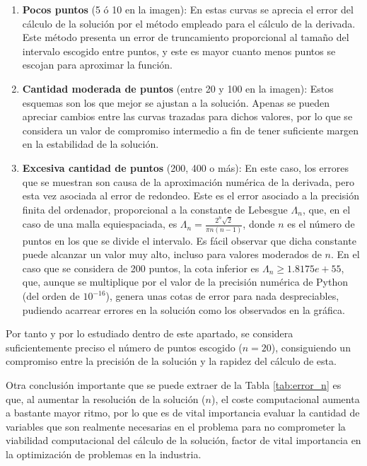 \begin{enumerate}
    \item \textbf{Pocos puntos} (5 ó 10 en la imagen): En estas curvas se aprecia el error del cálculo de la solución por el método empleado para el cálculo de la derivada. Este método presenta un error de truncamiento proporcional al tamaño del intervalo escogido entre puntos, y este es mayor cuanto menos puntos se escojan para aproximar la función.

    \item \textbf{Cantidad moderada de puntos} (entre 20 y 100 en la imagen): Estos esquemas son los que mejor se ajustan a la solución. Apenas se pueden apreciar cambios entre las curvas trazadas para dichos valores, por lo que se considera un valor de compromiso intermedio a fin de tener suficiente margen en la estabilidad de la solución.

    \item \textbf{Excesiva cantidad de puntos} (200, 400 o más): En este caso, los errores que se muestran son causa de la aproximación numérica de la derivada, pero esta vez asociada al error de redondeo. Este es el error asociado a la precisión finita del ordenador, proporcional a la constante de Lebesgue $\Lambda_n$, que, en el caso de una malla equiespaciada, es $\Lambda_n = \frac{2^n \sqrt{2}}{\pi n (n - 1)}$, donde $n$ es el número de puntos en los que se divide el intervalo. Es fácil observar que dicha constante puede alcanzar un valor muy alto, incluso para valores moderados de $n$. En el caso que se considera de 200 puntos, la cota inferior es $\Lambda_n \geq 1.8175e+55$, que,  aunque se multiplique por el valor de la precisión numérica de Python (del orden de $10^{-16}$), genera unas cotas de error para nada despreciables, pudiendo acarrear errores en la solución como los observados en la gráfica.
\end{enumerate}

Por tanto y por lo estudiado dentro de este apartado, se considera suficientemente preciso el número de puntos escogido ($n = 20$), consiguiendo un compromiso entre la precisión de la solución y la rapidez del cálculo de esta. 

Otra conclusión importante que se puede extraer de la Tabla \ref{tab:error_n} es que, al aumentar la resolución de la solución ($n$), el coste computacional aumenta a bastante mayor ritmo, por lo que es de vital importancia evaluar la cantidad de variables que son realmente necesarias en el problema para no comprometer la viabilidad computacional del cálculo de la solución, factor de vital importancia en la optimización de problemas en la industria.


